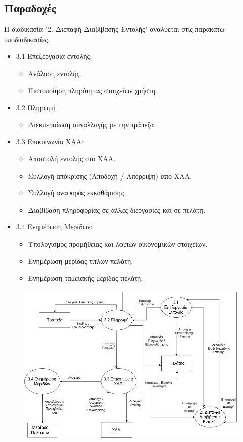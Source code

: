 \documentclass{article}
\begin{document}
	\subsection*{Παραδοχές}
	Η διαδικασία "2. Διεπαφή Διαβίβασης Εντολής" αναλύεται στις παρακάτω υποδιαδικασίες.
	\begin{itemize}
		\item 3.1 Επεξεργασία εντολής: 
			\begin{itemize}
				\item Ανάλυση εντολής.
				\item Πιστοποίηση πληρότητας στοιχείων χρήστη.
			\end{itemize}
		
		\item 3.2 Πληρωμή
			\begin{itemize}
				\item Διεκπεραίωση συναλλαγής με την τράπεζα.
			\end{itemize}

		\item 3.3 Επικοινωνία ΧΑΑ:
			\begin{itemize}
				\item Αποστολή εντολής στο ΧΑΑ.
				\item Συλλογή απόκρισης (Αποδοχή / Απόρριψη) από ΧΑΑ.
				\item Συλλογή αναφοράς εκκαθάρισης.
				\item Διαβίβαση πληροφορίας σε άλλες διεργασίες και σε πελάτη.
			\end{itemize}

		\item 3.4 Ενημέρωση Μερίδων:
		\begin{itemize}
			\item Υπολογισμός προμήθειας και λοιπών οικονομικών στοιχείων.
			\item Ενημέρωση μερίδας τίτλων πελάτη.
			\item Ενημέρωση ταμειακής μερίδας πελάτη.
		\end{itemize}
	\end{itemize}

	\begin{figure}[!h]
		\includegraphics[width=\linewidth]{../Structured_Analysis/Level_2_Diagram.png}
	\end{figure}
\end{document}
